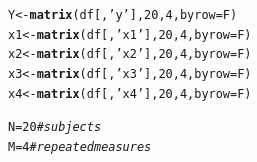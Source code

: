 \documentclass[11pt,a4paper,twoside]{book}\usepackage[]{graphicx}\usepackage[]{color}
\makeatletter
\newcommand{\hlnum}[1]{\textcolor[rgb]{0.686,0.059,0.569}{#1}}%
\newcommand{\hlstr}[1]{\textcolor[rgb]{0.192,0.494,0.8}{#1}}%
\newcommand{\hlcom}[1]{\textcolor[rgb]{0.678,0.584,0.686}{\textit{#1}}}%
\newcommand{\hlstd}[1]{\textcolor[rgb]{0.345,0.345,0.345}{#1}}%
\newcommand{\hlkwb}[1]{\textcolor[rgb]{0.69,0.353,0.396}{#1}}%
\newcommand{\hlkwc}[1]{\textcolor[rgb]{0.333,0.667,0.333}{#1}}%
\newcommand{\hlkwd}[1]{\textcolor[rgb]{0.737,0.353,0.396}{\textbf{#1}}}%
\newenvironment{kframe}{%
 \def\at@end@of@kframe{}%
 \ifinner\ifhmode%
  \def\at@end@of@kframe{\end{minipage}}%
  \begin{minipage}{\columnwidth}%
 \fi\fi%
 \def\FrameCommand##1{\hskip\@totalleftmargin \hskip-\fboxsep
 \colorbox{shadecolor}{##1}\hskip-\fboxsep
     \hskip-\linewidth \hskip-\@totalleftmargin \hskip\columnwidth}%
 \MakeFramed {\advance\hsize-\width
   \@totalleftmargin\z@ \linewidth\hsize
   \@setminipage}}%
 {\par\unskip\endMakeFramed%
 \at@end@of@kframe}
\newenvironment{knitrout}{}{} %
\makeatother
\begin{document}
\begin{knitrout}
\begin{kframe}
\begin{alltt}
\hlstd{Y} \hlkwb{<-} \hlkwd{matrix}\hlstd{(df[,}\hlstr{'y'}\hlstd{],} \hlnum{20}\hlstd{,} \hlnum{4}\hlstd{,} \hlkwc{byrow}\hlstd{=F)}
\hlstd{x1} \hlkwb{<-} \hlkwd{matrix}\hlstd{(df[,}\hlstr{'x1'}\hlstd{],} \hlnum{20}\hlstd{,} \hlnum{4}\hlstd{,} \hlkwc{byrow}\hlstd{=F)}
\hlstd{x2} \hlkwb{<-} \hlkwd{matrix}\hlstd{(df[,}\hlstr{'x2'}\hlstd{],} \hlnum{20}\hlstd{,} \hlnum{4}\hlstd{,} \hlkwc{byrow}\hlstd{=F)}
\hlstd{x3} \hlkwb{<-} \hlkwd{matrix}\hlstd{(df[,}\hlstr{'x3'}\hlstd{],} \hlnum{20}\hlstd{,} \hlnum{4}\hlstd{,} \hlkwc{byrow}\hlstd{=F)}
\hlstd{x4} \hlkwb{<-} \hlkwd{matrix}\hlstd{(df[,}\hlstr{'x4'}\hlstd{],} \hlnum{20}\hlstd{,} \hlnum{4}\hlstd{,} \hlkwc{byrow}\hlstd{=F)}

\hlstd{N} \hlkwb{=} \hlnum{20} \hlcom{#subjects}
\hlstd{M} \hlkwb{=} \hlnum{4} \hlcom{# repeated measures}
\end{alltt}
\end{kframe}
\end{knitrout}
\end{document}
